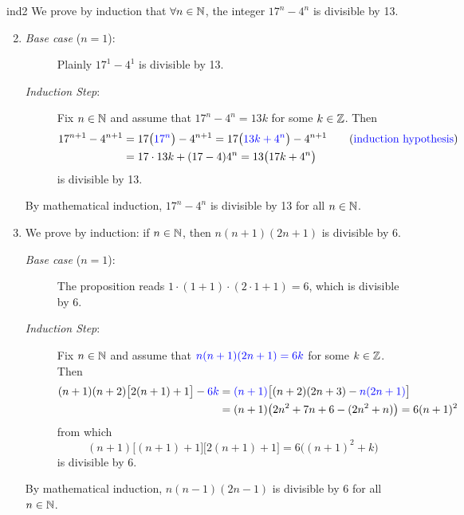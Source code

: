 \begin{examples}{}{ind2}
	\exstart We prove by induction that $\forall n\in\mathbb{N}$, the integer $17^n-4^n$ is divisible by 13.
	\begin{enumerate}\setcounter{enumi}{1}
		\item[]\begin{description}
			\item[\normalfont\emph{Base case} ($n=1$):] Plainly $17^1-4^1$ is divisible by 13.
			\item[\normalfont\emph{Induction Step}:] Fix $n\in\mathbb{N}$ and assume that $17^n-4^n=13k$ for some $k\in\mathbb{Z}$. Then
			\begin{align*}
				17^{n+1}-4^{n+1}&=17\bigl(\textcolor{blue}{17^n}\bigr)-4^{n+1}=17\bigl(\textcolor{blue}{13k+4^n}\bigr)-4^{n+1} \tag{\textcolor{blue}{induction hypothesis}}\\
				&=17\cdot 13k+(17-4)4^n =13\bigl(17k+4^n\bigr)
			\end{align*}
			is divisible by 13.
		\end{description}
		By mathematical induction, $17^n-4^n$ is divisible by 13 for all $n\in\mathbb{N}$.		
		
		\item\label{ex:ind22} We prove by induction: if $n\in\mathbb{N}$, then $n(n+1)(2n+1)$ is divisible by 6.
		\begin{description}
			\item[\normalfont\emph{Base case} ($n=1$):] The proposition reads $1\cdot (1+1)\cdot (2\cdot 1+1)=6$, which is divisible by 6.
			\item[\normalfont\emph{Induction Step}:] Fix $n\in\mathbb{N}$ and assume that $\textcolor{blue}{n(n+1)(2n+1)=6k}$ for some $k\in\mathbb{Z}$. Then
			\begin{align*}
					(n+1)(n+2)\bigl[2(n+1)+1\bigr]-\textcolor{blue}{6k}&=\textcolor{blue}{(n+1)}\bigl[(n+2)(2n+3)-\textcolor{blue}{n(2n+1)}\bigr]\\
					&=(n+1)\bigl(2n^2+7n+6-(2n^2+n)\bigr) =6(n+1)^2
				\end{align*}
			from which
			\[
				(n+1)\bigl[(n+1)+1\bigr]\bigl[2(n+1)+1\bigr] =6\bigl((n+1)^2+k\bigr)
			\]
			is divisible by 6.
		\end{description}
		By mathematical induction, $n(n-1)(2n-1)$ is divisible by 6 for all $n\in\mathbb{N}$.	
	\end{enumerate}
\end{examples}



